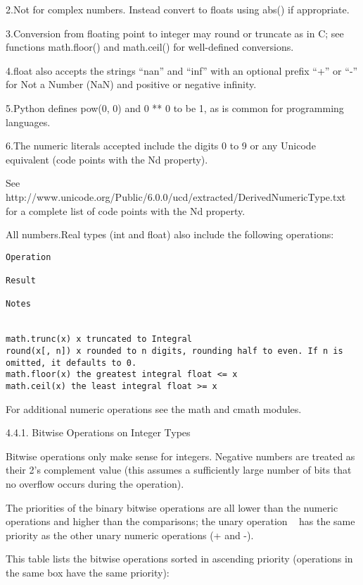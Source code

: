 2.Not for complex numbers. Instead convert to floats using abs() if appropriate.


3.Conversion from floating point to integer may round or truncate as in C; see functions math.floor() and math.ceil() for well-defined conversions.


4.float also accepts the strings “nan” and “inf” with an optional prefix “+” or “-” for Not a Number (NaN) and positive or negative infinity.


5.Python defines pow(0, 0) and 0 ** 0 to be 1, as is common for programming languages.


6.The numeric literals accepted include the digits 0 to 9 or any Unicode equivalent (code points with the Nd property).

See http://www.unicode.org/Public/6.0.0/ucd/extracted/DerivedNumericType.txt for a complete list of code points with the Nd property.


All numbers.Real types (int and float) also include the following operations:





\begin{lstlisting}
Operation

Result

Notes


math.trunc(x) x truncated to Integral   
round(x[, n]) x rounded to n digits, rounding half to even. If n is omitted, it defaults to 0.   
math.floor(x) the greatest integral float <= x   
math.ceil(x) the least integral float >= x   
\end{lstlisting}


For additional numeric operations see the math and cmath modules.


4.4.1. Bitwise Operations on Integer Types

Bitwise operations only make sense for integers. Negative numbers are treated as their 2’s complement value (this assumes a sufficiently large number of bits that no overflow occurs during the operation).

The priorities of the binary bitwise operations are all lower than the numeric operations and higher than the comparisons; the unary operation ~ has the same priority as the other unary numeric operations (+ and -).

This table lists the bitwise operations sorted in ascending priority (operations in the same box have the same priority):





